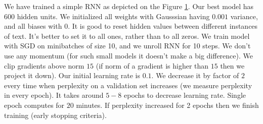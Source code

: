 \documentclass{article}
\begin{document}
We have trained a simple RNN as depicted on the Figure \ref{fig:schema}. Our best model has 600 hidden units.
We initialized all weights with Gausssian having $0.001$ variance, and all biases with $0$. 
It is good to reset hidden values between different instances of text. It's better to set it to all ones, rather
than to all zeros.
We train model with
SGD on minibatches of size 10, and we unroll RNN for 10 steps. We don't use any momentum (for such small models 
it doesn't make a big difference). We clip gradients above norm $15$ (if norm of a gradient is higher than $15$ then
we project it down).
Our initial learning rate is $0.1$. We decrease it by factor of $2$ every time
when perplexity on a validation set increases (we measure perplexity in every epoch). It takes around $5-8$ epochs
to decrease learning rate. Single epoch computes for $20$ minutes.
If perplexity increased 
for 2 epochs then we finish training (early stopping criteria).



\begin{figure}
  \label{fig:schema}
\end{figure}
\end{document}
